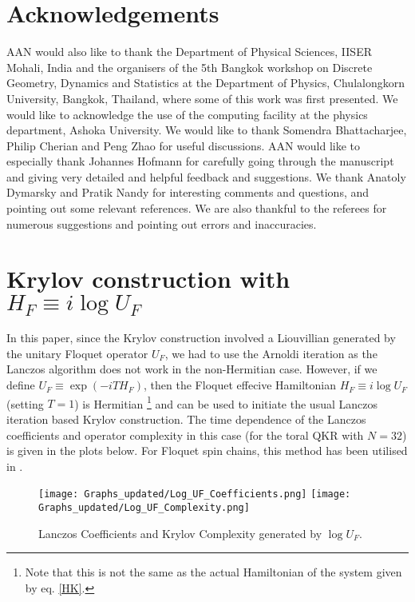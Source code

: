 \documentclass[a4paper,12pt]{article}
\begin{document}
\section*{Acknowledgements}
AAN would also like to thank the Department of Physical Sciences, IISER Mohali, India and the organisers of the 5th Bangkok workshop on Discrete Geometry, Dynamics and Statistics at the Department of Physics, Chulalongkorn University, Bangkok, Thailand, where some of this work was first presented.  We would like to acknowledge the use of the computing facility at the physics department, Ashoka University. We would like to thank Somendra Bhattacharjee, Philip Cherian and Peng Zhao for useful discussions. AAN would like to especially thank Johannes Hofmann for carefully going through the manuscript and giving very detailed and helpful feedback and suggestions. We thank Anatoly Dymarsky and Pratik Nandy for interesting comments and questions, and pointing out some relevant references. We are also thankful to the referees for numerous suggestions and pointing out errors and inaccuracies.

\appendix

\section{Krylov construction with $H_F \equiv i\log U_F$} \label{lnU}

In this paper, since the Krylov construction involved a Liouvillian generated by the unitary Floquet operator $U_F$, we had to use the Arnoldi iteration as the Lanczos algorithm does not work in the non-Hermitian case. However, if we define $U_F \equiv \exp(-iTH_F)$, then the Floquet effecive  Hamiltonian $H_F \equiv i \log U_F$ (setting $T=1$) is Hermitian \footnote{Note that this is not the same as the actual Hamiltonian of the system given by eq. \eqref{HK}.} and can be used to initiate the usual Lanczos iteration based Krylov construction.  The time dependence of the Lanczos coefficients and operator complexity in this case (for the toral QKR with $N=32$) is given in the plots below. For Floquet spin chains, this method has been utilised in \cite{Yates:2021lrt, Yates:2021asz}.

\begin{figure}[H]
    \centering
    \texttt{[image: Graphs\_updated/Log\_UF\_Coefficients.png]}
    \texttt{[image: Graphs\_updated/Log\_UF\_Complexity.png]}
    \caption{Lanczos Coefficients and Krylov Complexity generated by $\log U_F$.}
    \label{fig:7}
\end{figure}
\end{document}
